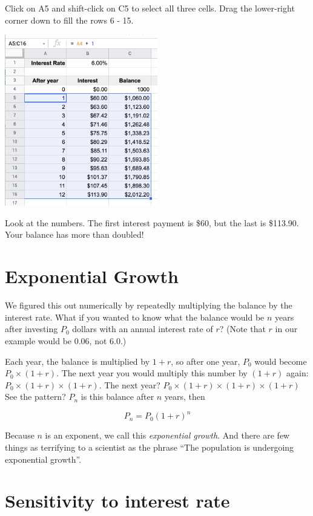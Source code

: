 Click on A5 and shift-click on C5 to select all three cells. Drag the
lower-right corner down to fill the rows 6 - 15.

\includegraphics[width=0.5\textwidth]{CopiedCellsInterest.png}

Look at the numbers.  The first interest payment is \$60, but the last
is \$113.90. Your balance has more than doubled!

\section{Exponential Growth}

We figured this out numerically by repeatedly multiplying the balance
by the interest rate. What if you wanted to know what the balance
would be $n$ years after investing $P_0$ dollars with an annual interest
rate of $r$? (Note that $r$ in our example would be 0.06, not 6.0.)

Each year, the balance is multiplied by $1 + r$, so after one year,
$P_0$ would become $P_0 \times (1 + r)$.  The next year you would multiply
this number by $(1 + r)$ again: $P_0 \times (1 + r) \times (1 + r)$. The
next year? $P_0 \times (1 + r) \times (1 + r) \times (1 + r)$ See the
pattern? $P_n$ is this balance after $n$ years, then

$$P_n = P_0 (1+r)^n$$

Because $n$ is an exponent, we call this \textit{exponential growth}.
And there are few things as terrifying to a scientist as
the phrase ``The population is undergoing exponential growth''.

\section{Sensitivity to interest rate}

